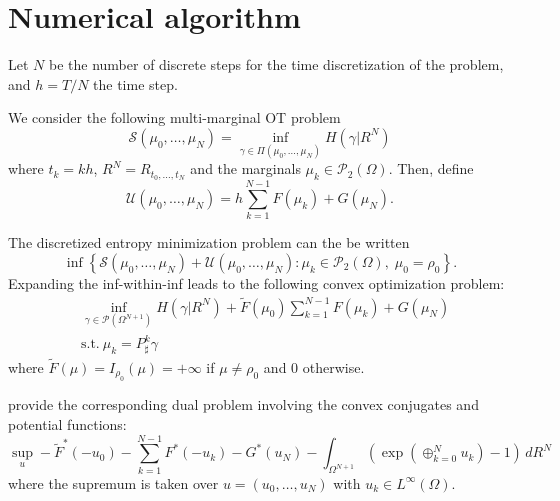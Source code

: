 \documentclass{article}
\newcommand{\calP}{\mathcal{P}}
\newcommand{\calS}{\mathcal{S}}
\newcommand{\suchthat}{\mathrm{s.t.}}
\begin{document}
    
    
    \section{Numerical algorithm}
    
    
    Let $N$ be the number of discrete steps for the time discretization of the problem, and $h=T/N$ the time step.
    
    We consider the following multi-marginal OT problem
    \begin{equation}
    	\calS(\mu_0,\ldots,\mu_N) =
    	\inf_{\gamma \in \Pi(\mu_0, \ldots, \mu_N)}
    	H(\gamma|R^N)
    \end{equation}
    where $t_k = kh$, $R^N = R_{t_0,\ldots,t_N}$ and the marginals $\mu_k \in \calP_2(\Omega)$.
    Then, define
    \[
    	\mathcal{U}(\mu_0,\ldots,\mu_N) = h\sum_{k=1}^{N-1} F(\mu_k) + G(\mu_N).
    \]
    
    The discretized entropy minimization problem can the be written
    \[
    	\inf\left\{
    	\calS(\mu_0, \ldots, \mu_N) +
    	\mathcal{U}(\mu_0, \ldots, \mu_N)
    	: \mu_k \in \calP_2(\Omega),\; \mu_0 = \rho_0
    	\right\}.
    \]
    Expanding the inf-within-inf leads to the following convex optimization problem:
    \begin{equation}
    \begin{aligned}
    	&\inf_{\gamma \in \calP(\Omega^{N+1})}
    	H(\gamma | R^N) + \tilde F(\mu_0) \sum_{k=1}^{N-1} F(\mu_k) + G(\mu_N) \\
    	&\suchthat\ \mu_k = P^k_\sharp\gamma
    \end{aligned}
    \end{equation}
    where $\tilde F(\mu) = I_{\rho_0}(\mu) = +\infty$ if $\mu\neq \rho_0$ and $0$ otherwise.
    
    \textcite{benamou2018entropy} provide the corresponding dual problem involving the convex conjugates and potential functions:
    \begin{equation}
    	\sup_u -\tilde F^*(-u_0) - \sum_{k=1}^{N-1} F^*(-u_k) - G^*(u_N)
    	- \int_{\Omega^{N+1}} \left(\exp\left(\oplus_{k=0}^N u_k\right)-1\right) \,dR^N
    \end{equation}
    where the supremum is taken over $u = (u_0,\ldots,u_N)$ with $u_k \in L^\infty(\Omega)$.
    
\end{document}
